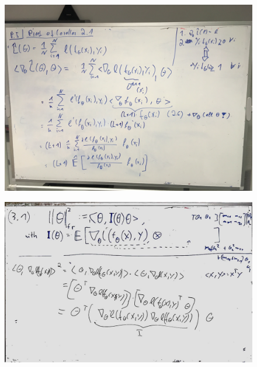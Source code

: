 \documentclass[a4paper]{article}
\begin{document}
\begin{figure}[htb]
	\centering
\includegraphics[width=\textwidth]{whiteboard_notes/05.jpg}
\end{figure}
\begin{figure}[htb]
	\centering
\includegraphics[width=\textwidth]{whiteboard_notes/3_1_proof.jpg}
\end{figure}
\end{document}
